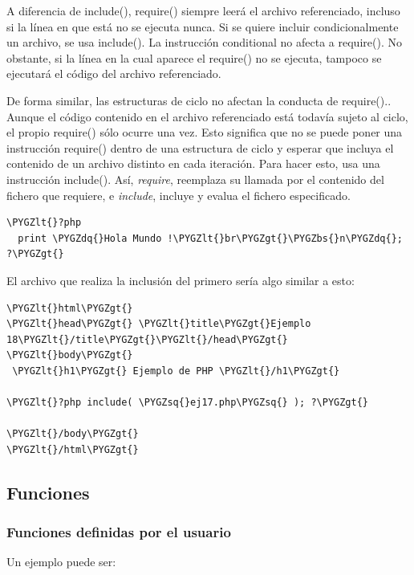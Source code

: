 \documentclass[a5paper,10pt,spanish]{sphinxmanual}
\def\PYGZbs{\char`\\}
\def\PYGZlt{\char`\<}
\def\PYGZgt{\char`\>}
\def\PYGZsq{\char`\'}
\def\PYGZdq{\char`\"}
\begin{document}
A diferencia de include(),
require() siempre leerá el
archivo referenciado, incluso si la línea en que está no se ejecuta
nunca. Si se quiere incluir condicionalmente un archivo, se usa
include(). La instrucción
conditional no afecta a
require(). No obstante, si la
línea en la cual aparece el
require() no se ejecuta,
tampoco se ejecutará el código del archivo referenciado.

De forma similar, las estructuras de ciclo no afectan la conducta de
require().. Aunque el código
contenido en el archivo referenciado está todavía sujeto al ciclo, el
propio require() sólo ocurre
una vez. Esto significa que no se puede poner una instrucción
require() dentro de una
estructura de ciclo y esperar que incluya el contenido de un archivo
distinto en cada iteración. Para hacer esto, usa una instrucción
include(). Así, \emph{require},
reemplaza su llamada por el contenido del fichero que requiere, e
\emph{include}, incluye y evalua el fichero especificado.

\begin{Verbatim}[commandchars=\\\{\}]
\PYGZlt{}?php
  print \PYGZdq{}Hola Mundo !\PYGZlt{}br\PYGZgt{}\PYGZbs{}n\PYGZdq{};
?\PYGZgt{}
\end{Verbatim}

El archivo que realiza la inclusión del primero sería algo similar a
esto:

\begin{Verbatim}[commandchars=\\\{\}]
\PYGZlt{}html\PYGZgt{}
\PYGZlt{}head\PYGZgt{} \PYGZlt{}title\PYGZgt{}Ejemplo 18\PYGZlt{}/title\PYGZgt{}\PYGZlt{}/head\PYGZgt{}
\PYGZlt{}body\PYGZgt{}
 \PYGZlt{}h1\PYGZgt{} Ejemplo de PHP \PYGZlt{}/h1\PYGZgt{}

\PYGZlt{}?php include( \PYGZsq{}ej17.php\PYGZsq{} ); ?\PYGZgt{}

\PYGZlt{}/body\PYGZgt{}
\PYGZlt{}/html\PYGZgt{}
\end{Verbatim}


\subsection{Funciones}
\label{Tutorial1_Conceptos.md:funciones}

\subsubsection{Funciones definidas por el usuario}
\label{Tutorial1_Conceptos.md:funciones-definidas-por-el-usuario}
Un ejemplo puede ser:
\end{document}
